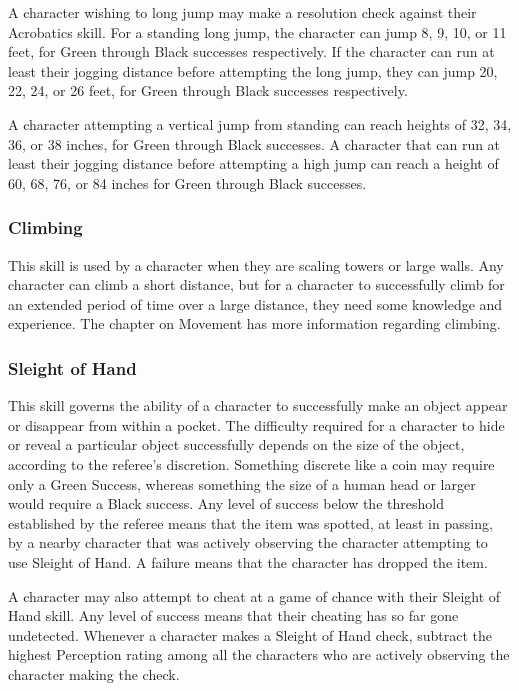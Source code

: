 \documentclass[oneside]{book}
\begin{document}
\begin{multicols}{2}
A character wishing to long jump may make a resolution check against their Acrobatics skill. For a standing long jump, the character can jump 8, 9, 10, or 11 feet, for Green through Black successes respectively.
If the character can run at least their jogging distance before attempting the long jump, they can jump 20, 22, 24, or 26 feet, for Green through Black successes respectively.

A character attempting a vertical jump from standing can reach heights of 32, 34, 36, or 38 inches, for Green through Black successes. A character that can run at least their jogging distance before attempting a high jump can reach a height of 60, 68, 76, or 84 inches for Green through Black successes.
\subsubsection{Climbing}
This skill is used by a character when they are scaling towers or large walls. Any character can climb a short distance, but for a character to successfully climb for an extended period of time over a large distance, they need some knowledge and experience. The chapter on Movement has more information regarding climbing. 

\subsubsection{Sleight of Hand}
This skill governs the ability of a character to successfully make an object appear or disappear from within a pocket. The difficulty required for a character to hide or reveal a particular object successfully depends on the size of the object, according to the referee's discretion. Something discrete like a coin may require only a Green Success, whereas something the size of a human head or larger would require a Black success. Any level of success below the threshold established by the referee means that the item was spotted, at least in passing, by a nearby character that was actively observing the character attempting to use Sleight of Hand. A failure means that the character has dropped the item. 

A character may also attempt to cheat at a game of chance with their Sleight of Hand skill. Any level of success means that their cheating has so far gone undetected. 
Whenever a character makes a Sleight of Hand check, subtract the highest Perception rating among all the characters who are actively observing the character making the check. 


\end{multicols}
\end{document}

